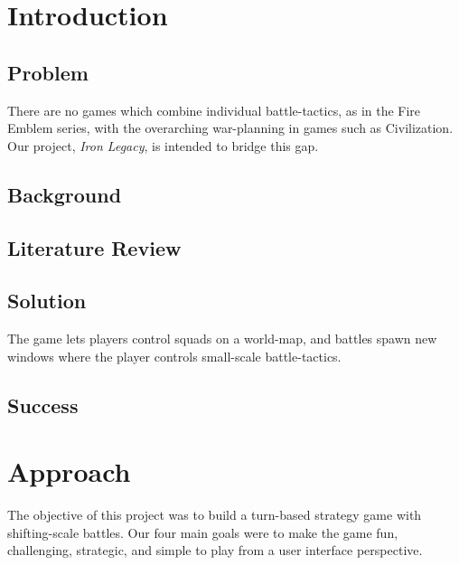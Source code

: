 \documentclass{article}
\begin{document}
\clearpage

\section*{Introduction}

\subsection*{Problem}
There are no games which combine individual battle-tactics, as in the Fire 
Emblem series, with the overarching war-planning in games such as Civilization.
Our project, \emph{Iron Legacy}, is intended to bridge this gap.

\subsection*{Background}

\subsection*{Literature Review}

\subsection*{Solution}
The game lets players control squads on a world-map, and battles spawn new 
windows where the player controls small-scale battle-tactics.

\subsection*{Success}

\section*{Approach}
The objective of this project was to build a turn-based strategy game with 
shifting-scale battles.
Our four main goals were to make the game fun, challenging, strategic, and 
simple to play from a user interface perspective.

\end{document}
